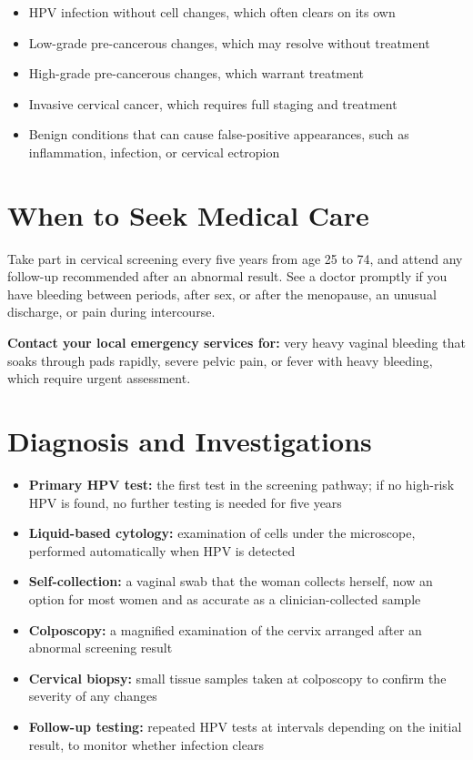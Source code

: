 \begin{itemize}
    \item HPV infection without cell changes, which often clears on its own
    \item Low-grade pre-cancerous changes, which may resolve without treatment
    \item High-grade pre-cancerous changes, which warrant treatment
    \item Invasive cervical cancer, which requires full staging and treatment
    \item Benign conditions that can cause false-positive appearances, such as inflammation, infection, or cervical ectropion
\end{itemize}

\section*{When to Seek Medical Care}
Take part in cervical screening every five years from age 25 to 74, and attend any follow-up recommended after an abnormal result. See a doctor promptly if you have bleeding between periods, after sex, or after the menopause, an unusual discharge, or pain during intercourse.

\textbf{Contact your local emergency services for:} very heavy vaginal bleeding that soaks through pads rapidly, severe pelvic pain, or fever with heavy bleeding, which require urgent assessment.

\section*{Diagnosis and Investigations}
\begin{itemize}
    \item \textbf{Primary HPV test:} the first test in the screening pathway; if no high-risk HPV is found, no further testing is needed for five years
    \item \textbf{Liquid-based cytology:} examination of cells under the microscope, performed automatically when HPV is detected
    \item \textbf{Self-collection:} a vaginal swab that the woman collects herself, now an option for most women and as accurate as a clinician-collected sample
    \item \textbf{Colposcopy:} a magnified examination of the cervix arranged after an abnormal screening result
    \item \textbf{Cervical biopsy:} small tissue samples taken at colposcopy to confirm the severity of any changes
    \item \textbf{Follow-up testing:} repeated HPV tests at intervals depending on the initial result, to monitor whether infection clears
\end{itemize}


